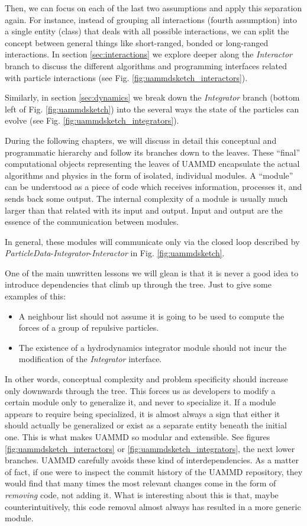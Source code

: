 \documentclass[ twoside,openright,titlepage,numbers=noenddot,%
headinclude,footinclude,cleardoublepage=empty,abstract=on,
BCOR=5mm,paper=b5,fontsize=11pt, dvipsnames
]{scrreprt}
\newcommand{\uammd}{\gls{UAMMD}\xspace}
\begin{document}
Then, we can focus on each of the last two assumptions and apply this separation again. For instance, instead of grouping all interactions (fourth assumption) into a single entity (class) that deals with all possible interactions, we can split the concept between general things like short-ranged, bonded or long-ranged interactions. In section \ref{sec:interactions} we explore deeper along the \emph{Interactor} branch to discuss the different algorithms and programming interfaces related with particle interactions (see Fig. \ref{fig:uammdsketch_interactors}).

Similarly, in section \ref{sec:dynamics} we break down the \emph{Integrator} branch (bottom left of Fig. \ref{fig:uammdsketch}) into the several ways the state of the particles can evolve (see Fig. \ref{fig:uammdsketch_integrators}).

During the following chapters, we will discuss in detail this conceptual and programmatic hierarchy and follow its branches down to the leaves. These ``final'' computational objects representing the leaves of \uammd encapsulate the actual algorithms and physics in the form of isolated, individual modules. A ``module'' can be understood as a piece of code which receives information, processes it, and sends back some output. The internal complexity of a module is usually much larger than that related with its input and output. Input and output are the essence of the communication between modules.

In general, these modules will communicate only via the closed loop described by \emph{ParticleData}-\emph{Integrator}-\emph{Interactor} in Fig. \ref{fig:uammdsketch}.

One of the main unwritten lessons we will glean is that it is never a good idea to introduce dependencies that climb up through the tree. Just to give some examples of this:
\begin{itemize}
\item A neighbour list should not assume it is going to be used to
  compute the forces of a group of repulsive particles.
\item The existence
  of a hydrodynamics integrator module should not incur the
  modification of the \emph{Integrator} interface.
\end{itemize}
In other words, conceptual complexity and problem specificity should increase only downwards through the tree. This forces us as developers to modify a certain module only to generalize it, and never to specialize it. If a module appears to require being specialized, it is almost always a sign that either it should actually be generalized or exist as a separate entity beneath the initial one. This is what makes \uammd so modular and extensible. See figures \ref{fig:uammdsketch_interactors} or \ref{fig:uammdsketch_integrators}, the next lower branches.
\uammd carefully avoids these kind of interdependencies. As a matter of fact, if one were to inspect the commit history of the \uammd repository, they would find that many times the most relevant changes come in the form of \emph{removing} code, not adding it. What is interesting about this is that, maybe counterintuitively, this code removal almost always has resulted in a more generic module.
\end{document}
